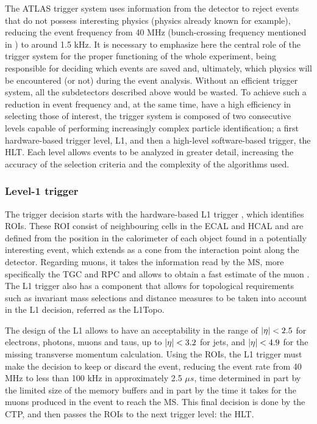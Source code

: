 The \ac{ATLAS} trigger system \cite{PerformanceTrigger2010,PerformanceTrigger2015,PerformanceTriggerRun2} uses information from the detector to reject events that do not possess interesting physics (physics already known for example), reducing the event frequency from 40 MHz (bunch-crossing frequency mentioned in \Sect{\ref{sec:atlas:LHC}}) to around 1.5 kHz. It is necessary to emphasize here the central role of the trigger system for the proper functioning of the whole experiment, being responsible for deciding which events are saved and, ultimately, which physics will be encountered (or not) during the event analysis. Without an efficient trigger system, all the subdetectors described above would be wasted. To achieve such a reduction in event frequency and, at the same time, have a high efficiency in selecting those of interest, the trigger system is composed of two consecutive levels capable of performing increasingly complex particle identification; a first hardware-based trigger level, \ac{L1}, and then a high-level software-based trigger, the \ac{HLT}. Each level allows events to be analyzed in greater detail, increasing the accuracy of the selection criteria and the complexity of the algorithms used.


\subsubsection{Level-1 trigger}

The trigger decision starts with the hardware-based \ac{L1} trigger \cite{ATLASL1Trigger}, which identifies \acp{ROI}. These \ac{ROI} consist of neighbouring cells in the \ac{ECAL} and \ac{HCAL} and are defined from the position in the calorimeter of each object found in a potentially interesting event, which extends as a cone from the interaction point along the detector.
Regarding muons, it takes the information read by the \ac{MS}, more specifically the \ac{TGC} and \ac{RPC} and allows to obtain a fast estimate of the muon \pt.
The \ac{L1} trigger also has a component that allows for topological requirements such as invariant mass selections and distance measures to be taken into account in the \ac{L1} decision, referred as the \ac{L1Topo}.

The design of the \ac{L1} allows to have an acceptability in the range of \(|\eta|<2.5\) for electrons, photons, muons and taus, up to \(|\eta|<3.2\) for jets, and \(|\eta|<4.9\) for the missing transverse momentum calculation.
Using the \acp{ROI}, the \ac{L1} trigger must make the decision to keep or discard the event, reducing the event rate from 40 MHz to less than 100 kHz in approximately 2.5 \(\mu s\), time determined in part by the limited size of the memory buffers and in part by the time it takes for the muons produced in the event to reach the \ac{MS}. This final decision is done by the \ac{CTP}, and then passes the \acp{ROI} to the next trigger level: the \ac{HLT}.



